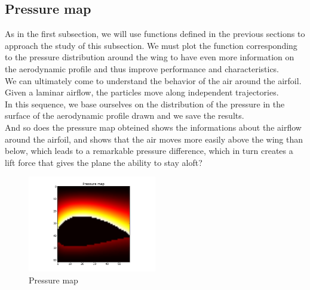 \subsection{Pressure map}
As in the first subsection, we will use functions defined in the previous sections to approach the study of this subsection.
We must plot the function corresponding to the pressure distribution around the wing to have even more information on the aerodynamic profile and thus improve performance and characteristics.\\
We can ultimately come to understand the behavior of the air around the airfoil.\\
Given a laminar airflow, the particles move along independent trajectories.\\
In this sequence, we base ourselves on the distribution of the pressure in the surface of the aerodynamic profile drawn and we save the results.\\
And so does the pressure map obteined shows the informations about the airflow around the airfoil, and shows that the air moves more easily above the wing than below, which leads to a remarkable pressure difference, which in turn creates a lift force that gives the plane the ability to stay aloft?\\
\begin{figure}[H]
  \centering
  \includegraphics[width=0.5\textwidth]{pressure_map.png}
  \caption{Pressure map}
  \label{fig:laminar}
\end{figure}
